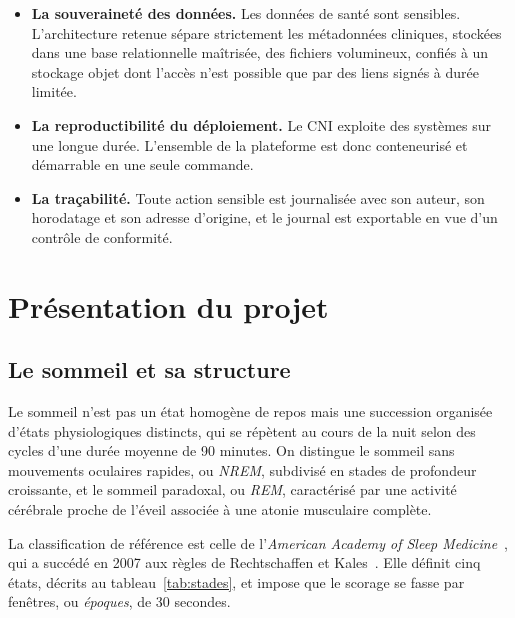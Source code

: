\begin{itemize}[itemsep=2pt,topsep=4pt]
  \item \textbf{La souveraineté des données.} Les données de santé sont sensibles.
        L'architecture retenue sépare strictement les métadonnées cliniques, stockées
        dans une base relationnelle maîtrisée, des fichiers volumineux, confiés à un
        stockage objet dont l'accès n'est possible que par des liens signés à durée
        limitée.
  \item \textbf{La reproductibilité du déploiement.} Le CNI exploite des systèmes sur
        une longue durée. L'ensemble de la plateforme est donc conteneurisé et
        démarrable en une seule commande.
  \item \textbf{La traçabilité.} Toute action sensible est journalisée avec son auteur,
        son horodatage et son adresse d'origine, et le journal est exportable en vue
        d'un contrôle de conformité.
\end{itemize}

\section{Présentation du projet}

\subsection{Le sommeil et sa structure}

Le sommeil n'est pas un état homogène de repos mais une succession organisée d'états
physiologiques distincts, qui se répètent au cours de la nuit selon des cycles d'une
durée moyenne de 90 minutes. On distingue le sommeil sans mouvements oculaires rapides,
ou \emph{NREM}, subdivisé en stades de profondeur croissante, et le sommeil paradoxal,
ou \emph{REM}, caractérisé par une activité cérébrale proche de l'éveil associée à une
atonie musculaire complète.

La classification de référence est celle de l'\emph{American Academy of Sleep
Medicine}~\cite{aasm2020}, qui a succédé en 2007 aux règles de Rechtschaffen et
Kales~\cite{rechtschaffen1968}. Elle définit cinq états, décrits au
tableau~\ref{tab:stades}, et impose que le scorage se fasse par fenêtres, ou
\emph{époques}, de 30 secondes.

